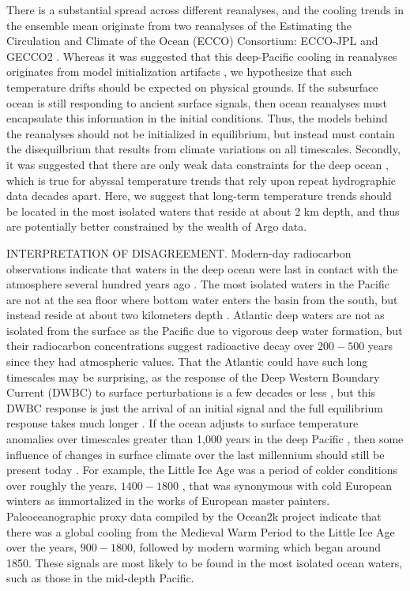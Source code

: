 \documentclass[authoryear,round,12pt]{article}
\begin{document}
There is a substantial spread across different reanalyses, and the
cooling trends in the ensemble mean originate from two reanalyses of
the Estimating the Circulation and Climate of the Ocean (ECCO)
Consortium: ECCO-JPL \citep{Fukumori--2002:partitioned} and GECCO2
\citep{Koehl--2015:Evaluation}.  Whereas it was suggested that this
deep-Pacific cooling in reanalyses originates from model
initialization artifacts \citep{Palmer-Roberts-2017:Ocean}, we
hypothesize that such temperature drifts should be expected on
physical grounds. If the subsurface ocean is still responding to
ancient surface signals, then ocean reanalyses must encapsulate this
information in the initial conditions. Thus, the models behind the
reanalyses should not be initialized in equilibrium, but instead must
contain the disequilbrium that results from climate variations on all
timescales. Secondly, it was suggested that there are only weak data
constraints for the deep ocean \citep{Palmer-Roberts-2017:Ocean},
which is true for abyssal temperature trends that rely upon repeat
hydrographic data decades apart. Here, we suggest that long-term
temperature trends should be located in the most isolated waters that
reside at about 2 km depth, and thus are potentially better
constrained by the wealth of Argo data.


INTERPRETATION OF DISAGREEMENT.
Modern-day radiocarbon observations indicate that waters in the deep
ocean were last in contact with the atmosphere several hundred years
ago \citep{Key-Kozyr-2004:global}. The most isolated waters in the
Pacific are not at the sea floor where bottom water enters the basin
from the south, but instead reside at about two kilometers depth
\citep{Matsumoto--2007:Radiocarbon}. Atlantic deep waters are not as
isolated from the surface as the Pacific due to vigorous deep water
formation, but their radiocarbon concentrations suggest radioactive
decay over $200-500$ years since they had atmospheric values.  That
the Atlantic could have such long timescales may be surprising, as the
response of the Deep Western Boundary Current (DWBC) to surface
perturbations is a few decades or less
\citep[e.g.,][]{Johnson-Marshall-2002:theory,Jackson-Peterson-2016:Recent},
but this DWBC response is just the arrival of an initial signal and
the full equilibrium response takes much longer
\citep{Khatiwala-Visbeck-2001:Age,Gebbie-Huybers-2012:mean}.  If the
ocean adjusts to surface temperature anomalies over timescales greater
than 1,000 years in the deep Pacific
\citep{Primeau--2005:Characterizing}, then some influence of changes
in surface climate over the last millennium should still be present
today \citep[e.g.,][]{Wunsch-Heimbach-2014:Bidecadal}. For example,
the Little Ice Age was a period of colder conditions over roughly the
years, $1400-1800$ \citep[e.g.,][]{Paasche-Bakke-2010:Defining}, that
was synonymous with cold European winters as immortalized in the works
of European master painters.  Paleoceanographic proxy data compiled by
the Ocean2k project \citep{Mcgregor-2015:Robust} indicate that there
was a global cooling from the Medieval Warm Period to the Little Ice
Age over the years, $900-1800$, followed by modern warming which began
around 1850. These signals are most likely to be found in the most
isolated ocean waters, such as those in the mid-depth Pacific.
\end{document}
